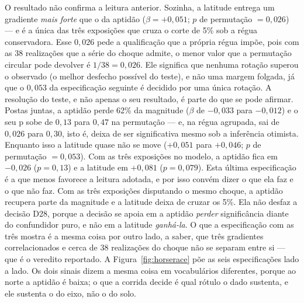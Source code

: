 O resultado não confirma a leitura anterior. Sozinha, a latitude entrega um
gradiente \emph{mais forte} que o da aptidão ($\beta = +0{,}051$; $p$ de
permutação $= 0{,}026$) --- e é a única das três exposições que cruza o corte
de 5\% sob a régua conservadora. Esse $0{,}026$ pede a qualificação que a
própria régua impõe, pois com as 38 realizações que a série do choque admite, o
menor valor que a permutação circular pode devolver é $1/38 = 0{,}026$. Ele
significa que nenhuma rotação superou o observado (o melhor desfecho
possível do teste), e não uma margem folgada, já que o $0{,}053$ da especificação
seguinte é decidido por uma única rotação. A resolução do teste, e não apenas
o seu resultado, é parte do que se pode afirmar. Postas juntas, a aptidão perde 62\% da
magnitude ($\beta$ de $-0{,}033$ para $-0{,}012$) e o seu p sobe de $0{,}13$
para $0{,}47$ na permutação --- e, na régua agrupada, sai de $0{,}026$ para
$0{,}30$, isto é, deixa de ser significativa mesmo sob a inferência otimista.
Enquanto isso a latitude quase não se move
($+0{,}051$ para $+0{,}046$; $p$ de permutação $= 0{,}053$). Com as três exposições no modelo,
a aptidão fica em $-0{,}026$ ($p = 0{,}13$) e a latitude em $+0{,}081$
($p = 0{,}079$). Esta última especificação é a que menos favorece a leitura
adotada, e por isso convém dizer o que ela faz e o que não faz. Com as três
exposições disputando o mesmo choque, a aptidão recupera parte da magnitude e
a latitude deixa de cruzar os 5\%. Ela não desfaz a decisão D28, porque a
decisão se apoia em a aptidão \emph{perder} significância diante do confundidor
puro, e não em a latitude \emph{ganhá-la}. O que a especificação com as três
mostra é a mesma coisa por outro lado, a saber, que três gradientes correlacionados e cerca
de 38 realizações do choque não se separam entre si --- que é o veredito
reportado. A Figura~\ref{fig:horserace} põe as seis especificações lado a
lado. Os dois sinais dizem a mesma coisa em vocabulários diferentes,
porque ao norte a aptidão é baixa; o que a corrida decide é qual rótulo o dado
sustenta, e ele sustenta o do eixo, não o do solo.

